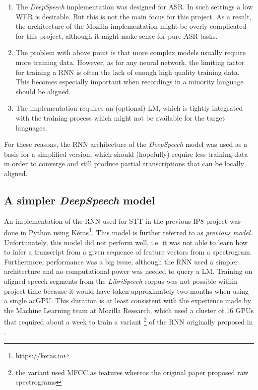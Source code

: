 \begin{enumerate}
	\item The \textit{DeepSpeech} implementation was designed for \ac{ASR}. In such settings a low \ac{WER} is desirable. But this is not the main focus for this project. As a result, the architecture of the Mozilla implementation might be overly complicated for this project, although it might make sense for pure \ac{ASR} tasks. 
	\item The problem with above point is that more complex models usually require more training data. However, as for any neural network, the limiting factor for training a \ac{RNN} is often the lack of enough high quality training data. This becomes especially important when recordings in a minority language should be aligned. 
	\item The implementation requires an (optional) \ac{LM}, which is tightly integrated with the training process which might not be available for the target languages.
\end{enumerate}

For these reasons, the \ac{RNN} architecture of the \textit{DeepSpeech} model was used as a basis for a simplified version, which should (hopefully) require less training data in order to converge and still produce partial transcriptions that can be locally aligned.

\subsection{A simpler \textit{DeepSpeech} model}

An implementation of the \ac{RNN} used for \ac{STT} in the previous IP8 project was done in Python using Keras\footnote{\url{https://keras.io}}. This model is further referred to as \textit{previous model}. Unfortunately, this model did not perform well, i.e. it was not able to learn how to infer a transcript from a given sequence of feature vectors from a spectrogram.  Furthermore, performance was a big issue, although the \ac{RNN} used a simpler architecture and no computational power was needed to query a \ac{LM}. Training on aligned speech segments from the \textit{LibriSpeech} corpus was not possible within project time because it would have taken approximately two months when using a single ac{GPU}. This duration is at least consistent with the experience made by the Machine Learning team at Mozilla Research, which used a cluster of 16 \acsp{GPU} that required about a week \parencite{mozillajourney} to train a variant \footnote{the variant used \ac{MFCC} as features whereas the original paper proposed raw spectrograms} of the \ac{RNN} originally proposed in \parencite{ctc_paper}.


